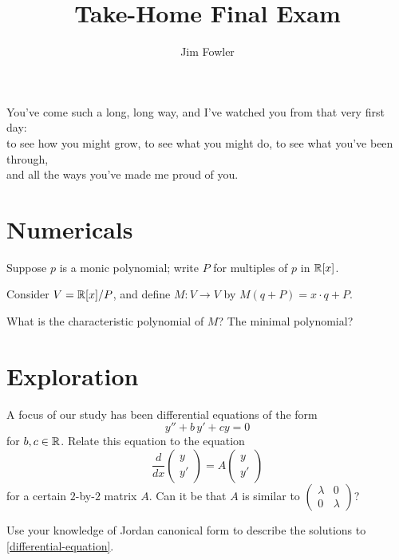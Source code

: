 \documentclass{homework}
\title{Take-Home Final Exam}
\author{Jim Fowler}
\begin{document}
\maketitle

\begin{inspiration}
You've come such a long, long way, and I've watched you from that very first day: \\
to see how you might grow, to see what you might do, to see what you've been through, \\ and all the ways you've made me proud of you. \\ 
\end{inspiration}

\section{Numericals}


\begin{problem}
  Suppose $p$ is a monic polynomial; write $P$ for multiples of $p$ in
  $\mathbb{R}[x]$.

  Consider $V = \mathbb{R}[x]/P$, and define $M : V \to V$ by $M(q + P) = x \cdot q + P$.

  What is the characteristic polynomial of $M$?  The minimal polynomial?
\end{problem}

\section{Exploration}

\begin{problem}
  A focus of our study has been differential equations of the form
  \begin{equation}\label{differential-equation}\tag{$*$}
    y'' + b\, y' + c y = 0
  \end{equation}
  for $b, c \in \mathbb{R}$.  Relate this equation to the equation
  \[
    \frac{d}{dx} \begin{pmatrix} y \\ y' \end{pmatrix} = A \begin{pmatrix} y \\ y' \end{pmatrix}
  \]
  for a certain $2$-by-$2$ matrix $A$.  Can it be that $A$ is similar to
  \(
    \displaystyle\begin{pmatrix} \lambda & 0 \\ 0 & \lambda  \end{pmatrix}
    \)?
    
  Use your knowledge of Jordan canonical form to describe the solutions to \eqref{differential-equation}.
\end{problem}
\end{document}
